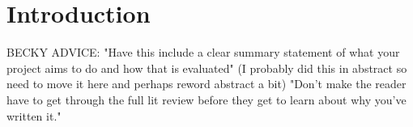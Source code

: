 \chapter{Introduction}

BECKY ADVICE: "Have this include a clear summary statement of what your project aims to do and how that is evaluated" (I probably did this in abstract so need to move it here and perhaps reword abstract a bit) "Don't make the reader have to get through the full lit review before they get to learn about why you've written it."